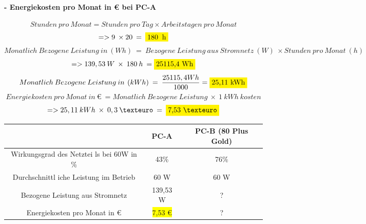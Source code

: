 \documentclass[a4paper]{article}
\begin{document}
    \paragraph{\color{codegreen} - Energiekosten pro Monat in € bei PC-A}
    \begin{equation*}
        Stunden\:pro\:Monat=Stunden\:pro\:Tag\times Arbeitstagen\:pro\:Monat
    \end{equation*}
    \begin{equation*}
        =>9\:\times 20\:=\:\colorbox{yellow}{180\: h}
    \end{equation*}
    \begin{equation*}
        Monatlich\:Bezogene\:Leistung\:in\:\left(Wh\right)\:=\:Bezogene\:Leistung\:aus\:Stromnetz\:\left(W\right)\:\times Stunden\:pro\:Monat\:\left(h\right)
    \end{equation*}
    \begin{equation*}
        =>  139,53\:W\:\times \:180\:h\:=\colorbox{yellow}{25115,4 Wh}
    \end{equation*}
    \begin{equation*}
        Monatlich\:Bezogene\:Leistung\:in\:\left(kWh\right)\:=\:\frac{25115,4 Wh}{1000}=\colorbox{yellow}{25,11 kWh}
    \end{equation*}
    \begin{equation*}
        Energiekosten\:pro\:Monat\:in\:€\:=Monatlich\:Bezogene\:Leistung\:\times \:1\: kWh\:kosten
    \end{equation*}
    \begin{equation*}
        => 25,11\:kWh\:\times \:0,3\:€\:=\:\colorbox{yellow}{7,53 €}
    \end{equation*}
    \begin{center}
        \begin{tabular}{|c|c|c|}
            \hline
            & {\color[HTML]{32CB00} PC-A} & {\color[HTML]{32CB00} PC-B \color[HTML]{FFD700}(80 Plus Gold)} \\ \hline
            {\color[HTML]{32CB00} Wirkungsgrad des Netztei ls bei 60W in \%} & {\color[HTML]{32CB00} 43\%}    & {\color[HTML]{32CB00} 76\%} \\ \hline
            {\color[HTML]{32CB00} Durchschnittl iche Leistung im Betrieb}    & {\color[HTML]{32CB00} 60 W}     & {\color[HTML]{32CB00} 60 W}  \\ \hline
            {\color[HTML]{32CB00} Bezogene Leistung aus Stromnetz}           & {\color[HTML]{32CB00} 139,53 W} & {\color[HTML]{FE0000} ?}    \\ \hline
            {\color[HTML]{32CB00} Energiekosten pro Monat in €}              & {\color[HTML]{CB0000} \colorbox{yellow}{7,53 €}}       & {\color[HTML]{FE0000} ?}    \\ \hline
        \end{tabular}
    \end{center}
\end{document}
